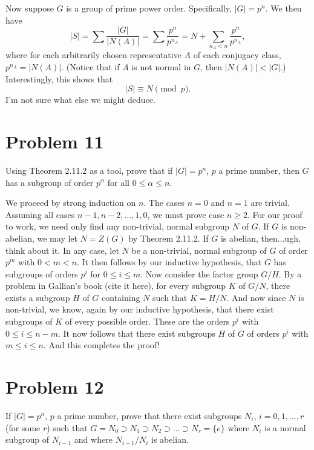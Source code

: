 \documentclass[12pt]{article}
\begin{document}
Now suppose $G$ is a group of prime power order.  Specifically, $|G|=p^n$.
We then have
\begin{equation*}
|S| = \sum\frac{|G|}{|N(A)|}=\sum\frac{p^n}{p^{n_A}}=  N+\sum_{n_A<n}\frac{p^n}{p^{n_A}},
\end{equation*}
where for each arbitrarily chosen representative $A$ of each conjugacy class, $p^{n_A}=|N(A)|$.
(Notice that if $A$ is not normal in $G$, then $|N(A)|<|G|$.)  Interestingly, this shows that
\begin{equation*}
|S|\equiv N\pmod{p}.
\end{equation*}
I'm not sure what else we might deduce.

\section*{Problem 11}

Using Theorem 2.11.2 as a tool, prove that if $|G|=p^n$, $p$ a prime number,
then $G$ has a subgroup of order $p^{\alpha}$ for all $0\leq\alpha\leq n$.

We proceed by strong induction on $n$.  The cases $n=0$ and $n=1$ are trivial.  Assuming all
cases $n-1, n-2, \dots, 1, 0$, we must prove case $n\geq 2$.
For our proof to work, we need only find any non-trivial, normal subgroup $N$ of $G$.
If $G$ is non-abelian, we may let $N=Z(G)$ by Theorem 2.11.2.  If $G$ is abelian,
then...ugh, think about it.  In any case, let $N$ be a non-trivial, normal subgroup of $G$
of order $p^m$ with $0<m<n$.  It then follows by our inductive hypothesis,
that $G$ has subgroups of orders $p^i$ for $0\leq i\leq m$.
Now consider the factor group $G/H$.
By a problem in Gallian's book (cite it here), for every subgroup $K$ of $G/N$,
there exists a subgroup $H$ of $G$ containing $N$ such that $K=H/N$.
And now since $N$ is non-trivial, we know, again by our inductive hypothesis,
that there exist subgroups of $K$ of every possible order.  These
are the orders $p^i$ with $0\leq i\leq n-m$.  It now follows that there
exist subgroups $H$ of $G$ of orders $p^i$ with $m\leq i\leq n$.
And this completes the proof!

\section*{Problem 12}

If $|G|=p^n$, $p$ a prime number, prove that there exist subgroups
$N_i$, $i=0,1,\dots,r$ (for some $r$) such that $G=N_0\supset N_1\supset N_2\supset\dots\supset N_r=\{e\}$
where $N_i$ is a normal subgroup of $N_{i-1}$ and where $N_{i-1}/N_i$ is abelian.
\end{document}
